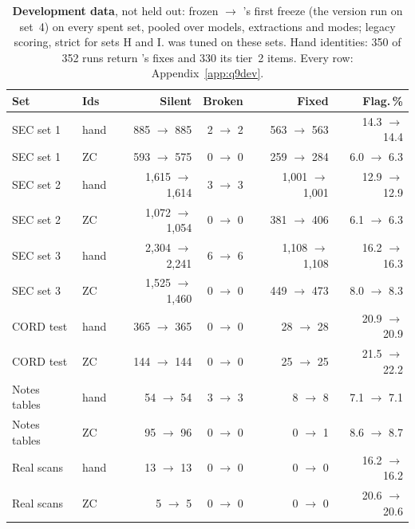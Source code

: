 \begin{table}[h]
\centering\footnotesize\setlength{\tabcolsep}{4pt}
\caption{\textbf{Development data}, not held out: frozen  $\rightarrow$ 's first freeze (the version run on set~4) on every spent set, pooled over models, extractions and modes; legacy scoring, strict for sets H and I.  was tuned on these sets. Hand identities: 350 of 352 runs return 's fixes and 330 its tier~2 items. Every row: Appendix~\ref{app:q9dev}.}
\label{tab:dev9}
\begin{tabular}{llrrrr}
\toprule
Set & Ids & Silent & Broken & Fixed & Flag.\,\% \\
\midrule
SEC set 1 & hand & 885 $\rightarrow$ 885 & 2 $\rightarrow$ 2 & 563 $\rightarrow$ 563 & 14.3 $\rightarrow$ 14.4 \\
SEC set 1 & ZC & 593 $\rightarrow$ 575 & 0 $\rightarrow$ 0 & 259 $\rightarrow$ 284 & 6.0 $\rightarrow$ 6.3 \\
SEC set 2 & hand & 1,615 $\rightarrow$ 1,614 & 3 $\rightarrow$ 3 & 1,001 $\rightarrow$ 1,001 & 12.9 $\rightarrow$ 12.9 \\
SEC set 2 & ZC & 1,072 $\rightarrow$ 1,054 & 0 $\rightarrow$ 0 & 381 $\rightarrow$ 406 & 6.1 $\rightarrow$ 6.3 \\
SEC set 3 & hand & 2,304 $\rightarrow$ 2,241 & 6 $\rightarrow$ 6 & 1,108 $\rightarrow$ 1,108 & 16.2 $\rightarrow$ 16.3 \\
SEC set 3 & ZC & 1,525 $\rightarrow$ 1,460 & 0 $\rightarrow$ 0 & 449 $\rightarrow$ 473 & 8.0 $\rightarrow$ 8.3 \\
CORD test & hand & 365 $\rightarrow$ 365 & 0 $\rightarrow$ 0 & 28 $\rightarrow$ 28 & 20.9 $\rightarrow$ 20.9 \\
CORD test & ZC & 144 $\rightarrow$ 144 & 0 $\rightarrow$ 0 & 25 $\rightarrow$ 25 & 21.5 $\rightarrow$ 22.2 \\
Notes tables & hand & 54 $\rightarrow$ 54 & 3 $\rightarrow$ 3 & 8 $\rightarrow$ 8 & 7.1 $\rightarrow$ 7.1 \\
Notes tables & ZC & 95 $\rightarrow$ 96 & 0 $\rightarrow$ 0 & 0 $\rightarrow$ 1 & 8.6 $\rightarrow$ 8.7 \\
Real scans & hand & 13 $\rightarrow$ 13 & 0 $\rightarrow$ 0 & 0 $\rightarrow$ 0 & 16.2 $\rightarrow$ 16.2 \\
Real scans & ZC & 5 $\rightarrow$ 5 & 0 $\rightarrow$ 0 & 0 $\rightarrow$ 0 & 20.6 $\rightarrow$ 20.6 \\

\end{tabular}
\end{table}
